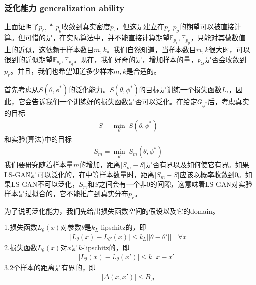         \subsubsection{泛化能力 generalization ability}
            \par
            上面证明了$p_G\triangleq p_g$收敛到真实密度$p_r$，但这是建立在$p_r,p_g$的期望可以被直接计算。但可惜的是，在实际算法中，并不能直接计算期望$\mathbb{E}_{p_r},\mathbb{E}_{p_g}$，只能对其做数值上的近似，这依赖于样本数目$m,k$。我们自然知道，当样本数目$m,k$很大时，可以很到的近似期望$\mathbb{E}_{p_r},\mathbb{E}_{p_g}$。现在，我们好奇的是，增加样本的量，$p_G$是否会收敛到$p_r$。并且，我们也希望知道多少样本$m,k$是合适的。
            \par
            首先考虑从$S(\theta,\phi^*)$的泛化能力。$S(\theta,\phi^*)$的目标是训练一个损失函数$L_\theta$，因此，它会告诉我们一个训练好的损失函数是否可以泛化。在给定$G_{\phi^*}$后，考虑真实的目标
            \begin{align*}
            S = \min_\theta \ S(\theta,\phi^*)
            \end{align*}
            和实验(算法)中的目标
            \begin{align*}
            S_m = \min_\theta \ S_m(\theta,\phi^*)
            \end{align*}
            我们要研究随着样本量$m$的增加，距离$|S_m - S|$是否有界以及如何使它有界。如果LS-GAN是可以泛化的，在中等样本数量时，距离$|S_m-S|$应该以概率收敛到0。如果LS-GAN不可以泛化，$S_m$和$S$之间会有一个非0的间隙，这意味着LS-GAN对实验样本是过拟合的，它不能推广到真实分布$p_r$。
            \par
            为了说明泛化能力，我们先给出损失函数空间的假设以及它的domain。
            \begin{Assumption}[2]
            1.损失函数$L_\theta(x)$对参数$\theta$是$k_L$-lipschitz的，即
            \begin{align*}
            |L_\theta(x) - L_{\theta'}(x)| \leqslant k_L||\theta-\theta'|| \quad \forall x
            \end{align*}
            2.损失函数$L_\theta(x)$对$x$是$k$-lipschitz的，即
            \begin{align*}
            |L_\theta(x) - L_\theta(x')| \leqslant k||x-x'||
            \end{align*}
            3.2个样本的距离是有界的，即
            \begin{align*}
            |\Delta (x,x')| \leqslant B_\Delta
            \end{align*}
            \end{Assumption}

